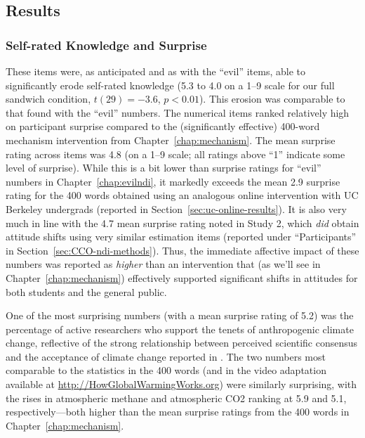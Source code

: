 % 

\subsection{Results}

\subsubsection{Self-rated Knowledge and Surprise}

These items were, as anticipated and as with the “evil” items, able to
significantly erode self-rated knowledge (5.3 to 4.0 on a 1--9 scale for our full sandwich
condition, $t(29)=-3.6$, $p<0.01$).  This erosion was comparable to that found
with the “evil” numbers.  The numerical items ranked relatively high on
participant surprise compared to the (significantly effective) 400-word
mechanism intervention from Chapter~\ref{chap:mechanism}.  The mean surprise
rating across items was 4.8 (on a 1--9 scale; all ratings above “1” indicate
some level of surprise).  While this is a bit lower than surprise ratings for
“evil” numbers in Chapter~\ref{chap:evilndi}, it markedly exceeds the mean 2.9
surprise rating for the 400 words obtained using an analogous online
intervention with UC Berkeley undergrads (reported in
Section~\ref{sec:uc-online-results}). It is also very much in line with the 4.7
mean surprise rating noted in Study 2, which \emph{did} obtain attitude shifts
using very similar estimation items (reported under “Participants” in
Section~\ref{sec:CCO-ndi-methods}). Thus, the immediate affective impact of
these numbers was reported as \emph{higher} than an intervention that (as we'll
see in Chapter~\ref{chap:mechanism}) effectively supported significant shifts in
attitudes for both students and the general public.

One of the most surprising numbers (with a mean surprise rating of 5.2) was the percentage of active
researchers who support the tenets of anthropogenic climate change, reflective
of the strong relationship between perceived scientific consensus and the acceptance
of climate change reported in \textcite{lewandowsky_pivotal_2013}. The two
numbers most comparable to the statistics in the 400 words (and in the video
adaptation available at \url{http://HowGlobalWarmingWorks.org}) were similarly
surprising, with the rises in atmospheric methane and atmospheric CO2 ranking at
5.9 and 5.1, respectively---both higher than the mean surprise ratings from the
400 words in Chapter~\ref{chap:mechanism}.



